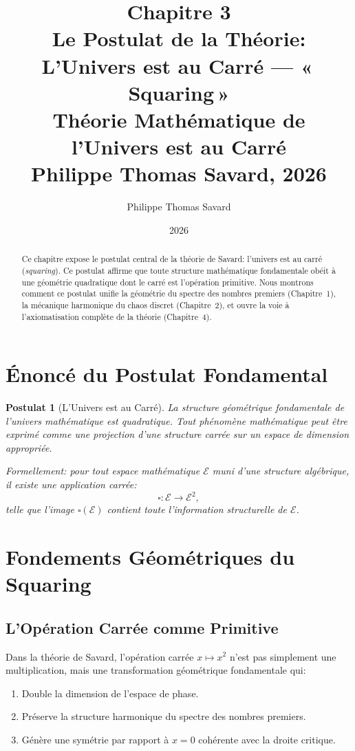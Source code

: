 \documentclass[12pt,a4paper]{article}
\title{%
  \textbf{Chapitre 3}\\[0.5em]
  \Large Le Postulat de la Théorie:\\
  L'Univers est au Carré — «\,Squaring\,»\\[0.5em]
  \large Théorie Mathématique de l'Univers est au Carré\\[0.5em]
  \normalsize Philippe Thomas Savard, 2026
}
\author{Philippe Thomas Savard}
\date{2026}
\newtheorem{postulat}{Postulat}
\begin{document}
\maketitle
\tableofcontents
\newpage

\begin{abstract}
Ce chapitre expose le postulat central de la théorie de Savard: l'univers est au carré
(\emph{squaring}). Ce postulat affirme que toute structure mathématique fondamentale
obéit à une géométrie quadratique dont le carré est l'opération primitive. Nous montrons
comment ce postulat unifie la géométrie du spectre des nombres premiers (Chapitre~1),
la mécanique harmonique du chaos discret (Chapitre~2), et ouvre la voie à l'axiomatisation
complète de la théorie (Chapitre~4).
\end{abstract}

\section{Énoncé du Postulat Fondamental}

\begin{postulat}[L'Univers est au Carré]
La structure géométrique fondamentale de l'univers mathématique est quadratique.
Tout phénomène mathématique peut être exprimé comme une projection d'une structure
carrée sur un espace de dimension appropriée.

Formellement: pour tout espace mathématique $\mathcal{E}$ muni d'une structure
algébrique, il existe une application carrée:
\[
  \square: \mathcal{E} \longrightarrow \mathcal{E}^2,
\]
telle que l'image $\square(\mathcal{E})$ contient toute l'information structurelle
de $\mathcal{E}$.
\end{postulat}

\section{Fondements Géométriques du Squaring}

\subsection{L'Opération Carrée comme Primitive}

Dans la théorie de Savard, l'opération carrée $x \mapsto x^2$ n'est pas simplement
une multiplication, mais une transformation géométrique fondamentale qui:

\begin{enumerate}
  \item Double la dimension de l'espace de phase.
  \item Préserve la structure harmonique du spectre des nombres premiers.
  \item Génère une symétrie par rapport à $x = 0$ cohérente avec la droite critique.
\end{enumerate}
\end{document}
